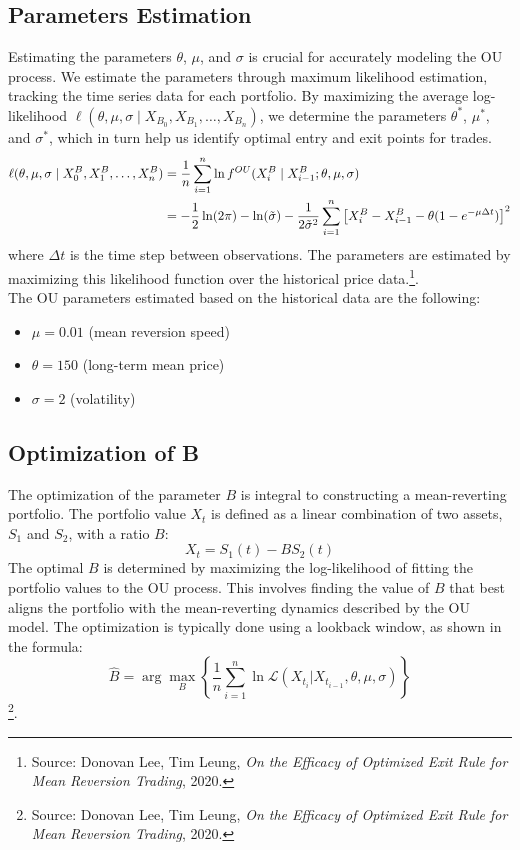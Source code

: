 \documentclass{article}
\begin{document}
\subsection*{Parameters Estimation}
Estimating the parameters \( \theta \), \( \mu \), and \( \sigma \) is crucial for accurately modeling the OU process. We estimate the parameters through maximum likelihood estimation, tracking the time series data for each portfolio. By maximizing the average log-likelihood $\ell(\theta, \mu, \sigma \mid X_{B_0}, X_{B_1}, \ldots, X_{B_n})$, we determine the parameters $\theta^*$, $\mu^*$, and $\sigma^*$, which in turn help us identify optimal entry and exit points for trades.
\begin{align}
\ell(\theta, \mu, \sigma \mid X_0^B, X_1^B, \ldots, X_n^B) &= \frac{1}{n} \sum_{i=1}^n \ln f^{OU}(X_i^B \mid X_{i-1}^B; \theta, \mu, \sigma) \notag \\
&= -\frac{1}{2} \ln(2\pi) - \ln(\tilde{\sigma}) - \frac{1}{2 \tilde{\sigma}^2} \sum_{i=1}^n \left[ X_i^B - X_{i-1}^B - \theta (1 - e^{-\mu \Delta t}) \right]^2
\end{align}
where \( \Delta t \) is the time step between observations. The parameters are estimated by maximizing this likelihood function over the historical price data.\footnote{Source: Donovan Lee, Tim Leung, \textit{On the Efficacy of Optimized Exit Rule for Mean Reversion Trading}, 2020.}.\\

The OU parameters estimated based on the historical data are the following:
\begin{itemize}
    \item $\mu = 0.01$ \quad (mean reversion speed)
    \item $\theta = 150$ \quad (long-term mean price)
    \item $\sigma = 2$ \quad (volatility)
\end{itemize}

\subsection*{Optimization of B}
The optimization of the parameter \( B \) is integral to constructing a mean-reverting portfolio. The portfolio value \( X_t \) is defined as a linear combination of two assets, \( S_1 \) and \( S_2 \), with a ratio \( B \):
\begin{equation}
X_t = S_1(t) - B S_2(t)
\end{equation}
The optimal \( B \) is determined by maximizing the log-likelihood of fitting the portfolio values to the OU process. This involves finding the value of \( B \) that best aligns the portfolio with the mean-reverting dynamics described by the OU model. The optimization is typically done using a lookback window, as shown in the formula:
\begin{equation}
\hat{B} = \arg \max_{B} \left\{ \frac{1}{n} \sum_{i=1}^{n} \ln \mathcal{L} \left( X_{t_i} | X_{t_{i-1}}, \theta, \mu, \sigma \right) \right\}
\end{equation} \footnote{Source: Donovan Lee, Tim Leung, \textit{On the Efficacy of Optimized Exit Rule for Mean Reversion Trading}, 2020.}.\\
\end{document}
